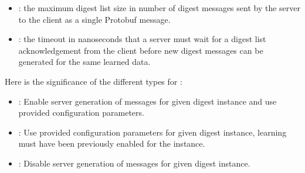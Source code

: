 \documentclass[11pt]{article}
\begin{document}
{\begin{itemize}
\begin{itemize}[noitemsep,topsep=\mdcompacttopsep]
\item{}: the maximum digest list size \textemdash{} in number of digest
messages \textemdash{} sent by the server to the client as a single 
Protobuf message.%

\item{}: the timeout in nanoseconds that a server must wait for a
digest list acknowledgement from the client before new digest messages can
be generated for the same learned data.%
\end{itemize}%
\end{itemize}%

\noindent{}Here is the significance of the different  types for :%

\begin{itemize}[noitemsep,topsep=\mdcompacttopsep]%

\item{}: Enable server generation of  messages for given digest
instance and use provided configuration parameters.%

\item{}: Use provided configuration parameters for given digest instance,
learning must have been previously enabled for the instance.%

\item{}: Disable server generation of  messages for given digest
instance.%
\end{itemize}%

}
\end{document}
